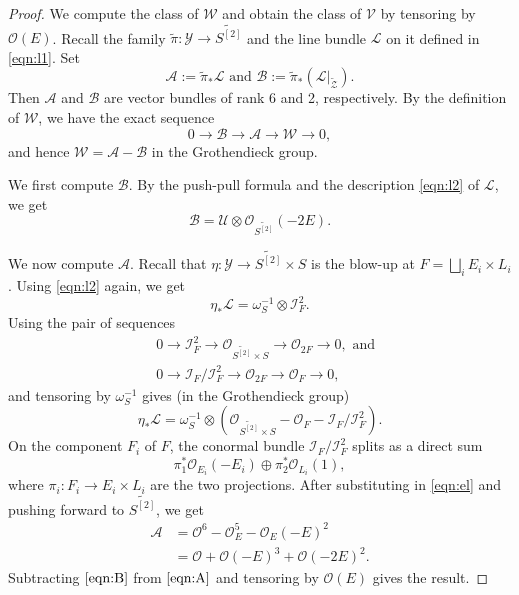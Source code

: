 \documentclass[reqno]{amsart}
\renewcommand{\to}{{\longrightarrow}}
\numberwithin{equation}{section}
\renewcommand{\O}{\mathcal{O}}
\newcommand{\td}{\widetilde}
\begin{document}
\begin{proof}
  We compute the class of $\mathcal{W}$ and obtain the class of $\mathcal{V}$ by tensoring by $\O(E)$.
  Recall the family $\widetilde{\pi} \colon \mathcal{Y} \to \widetilde{S^{[2]}}$ and the line bundle $\mathcal{L}$ on it defined in \eqref{eqn:l1}.
  Set
  \[ \mathcal{A} := \widetilde{\pi}_* \mathcal{L} \text{ and } \mathcal{B} := \widetilde{\pi}_* \left( \mathcal{L}|_{\widetilde{\mathcal{Z}}} \right).\]
  Then $\mathcal{A}$ and $\mathcal{B}$ are vector bundles of rank 6 and 2, respectively.
  By the definition of $\mathcal{W}$, we have the exact sequence
  \[ 0 \to \mathcal{B} \to \mathcal{A} \to \mathcal{W} \to 0,\]
  and hence $\mathcal{W} = \mathcal{A} - \mathcal{B}$ in the Grothendieck group.

  We first compute $\mathcal{B}$.
  By the push-pull formula and the description \eqref{eqn:l2} of $\mathcal{L}$, we get
  \begin{equation}\label{eqn:B}
    \mathcal{B} = \mathcal{U} \otimes \O_{\widetilde{S^{[2]}}}(-2E).
  \end{equation}

  We now compute $\mathcal{A}$.
  Recall that $\eta \colon \mathcal{Y} \to \widetilde{S^{[2]}} \times S$ is the blow-up at $F = \bigsqcup_i E_i \times L_i$.
  Using \eqref{eqn:l2} again, we get
  \[
    \eta_* \mathcal{L} = \omega_S^{-1} \otimes \mathcal{I}^2_{F}.
  \]
  Using the pair of sequences
  \begin{equation}
    \label{eq:seqA}
    \begin{split}
      &0 \to \mathcal{I}^2_{F} \to \O_{\td{S^{[2]}} \times S} \to \O_{2F} \to 0, \text{ and}\\
      &0 \to \mathcal{I}_{F}/\mathcal{I}_{F}^{2} \to \O_{2F} \to \O_{F} \to 0,
    \end{split}
  \end{equation}
  and tensoring by $\omega_S^{-1}$ gives (in the Grothendieck group)
  \begin{equation}\label{eqn:el}
    \eta_* \mathcal{L} = \omega_S^{-1} \otimes \left(\O_{\widetilde{S^{[2]}} \times S} - \O_F - \mathcal{I}_F / \mathcal{I}^2_F\right).
  \end{equation}
  On the component $F_i$ of $F$, the conormal bundle $\mathcal{I}_F / \mathcal{I}^2_F$ splits as a direct sum
  \[ \pi_1^*\O_{E_i}(-E_i) \oplus \pi_2^*\O_{L_i}(1),\]
  where $\pi_i \colon F_i \to E_i \times L_i$ are the two projections.
  After substituting in \eqref{eqn:el} and pushing forward to $\widetilde{S^{[2]}}$, we get
  \begin{equation}\label{eqn:A}
    \begin{split}
      \mathcal{A} &= \O^6- \O_E^{5}- \O_E(-E)^{2}\\
      &= \O + \O(-E)^3 + \O(-2E)^2.
    \end{split}
  \end{equation}
  Subtracting $\eqref{eqn:B}$ from $\eqref{eqn:A}$ and tensoring by $\O(E)$ gives the result.
\end{proof}
\end{document}
